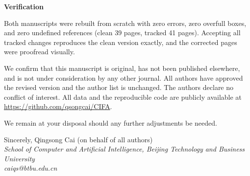 \documentclass[11pt]{article}
\renewcommand{\subsection}[1]{\vspace{0.35em}\noindent\textbf{#1}\par\nobreak\vspace{0.1em}}
\begin{document}
\subsection{Verification}

Both manuscripts were rebuilt from scratch with zero errors, zero overfull
boxes, and zero undefined references (clean 39 pages, tracked 41 pages).
Accepting all tracked changes reproduces the clean version exactly, and the
corrected pages were proofread visually.

We confirm that this manuscript is original, has not been published elsewhere,
and is not under consideration by any other journal. All authors have approved
the revised version and the author list is unchanged. The authors declare no
conflict of interest. All data and the reproducible code are publicly available
at \url{https://github.com/qsongcai/CIFA}.

\vspace{0.15em}
We remain at your disposal should any further adjustments be needed.

\vspace{0.2em}
Sincerely, Qingsong Cai (on behalf of all authors)\\
\textit{School of Computer and Artificial Intelligence, Beijing Technology and
Business University}\\
\textit{caiqs@btbu.edu.cn}
\end{document}
